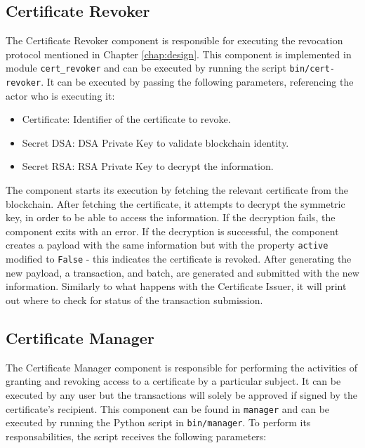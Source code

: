 \subsection{Certificate Revoker}

The Certificate Revoker component is responsible for executing the revocation protocol mentioned in Chapter \ref{chap:design}. This component is implemented in module \texttt{cert\_revoker} and can be executed by running the script \texttt{bin/cert-revoker}. It can be executed by passing the following parameters, referencing the actor who is executing it:

\begin{itemize}
	\item Certificate: Identifier of the certificate to revoke.
	\item Secret DSA: DSA Private Key to validate blockchain identity.
	\item Secret RSA: RSA Private Key to decrypt the information.
\end{itemize}

The component starts its execution by fetching the relevant certificate from the blockchain. After fetching the certificate, it attempts to decrypt the symmetric key, in order to be able to access the information. If the decryption fails, the component exits with an error. If the decryption is successful, the component creates a payload with the same information but with the property \texttt{active} modified to \texttt{False} - this indicates the certificate is revoked. After generating the new payload, a transaction, and batch, are generated and submitted with the new information. Similarly to what happens with the Certificate Issuer, it will print out where to check for status of the transaction submission.

\subsection{Certificate Manager}

The Certificate Manager component is responsible for performing the activities of granting and revoking access to a certificate by a particular subject. It can be executed by any user but the transactions will solely be approved if signed by the certificate's recipient. This component can be found in \texttt{manager} and can be executed by running the Python script in \texttt{bin/manager}. To perform its responsabilities, the script receives the following parameters:

